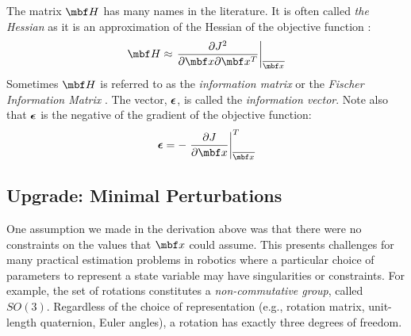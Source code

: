 \documentclass[11pt,a4,oneside]{article}
\begin{document}
The matrix $\mbf H$ has many names in the literature. It is often called {\em the Hessian} as it is an approximation of the Hessian of the objective function \citep{Triggs0000}:
\begin{equation}
  \mbf H \approx \left.\frac{\partial J^2}{\partial\mbf x \partial \mbf x^T}\right|_{\mbfbar x}
\end{equation}
 Sometimes $\mbf H$ is referred to as the {\em information matrix} or the {\em Fischer Information Matrix} \citep{Jauffret0700}. The vector, ${\boldsymbol{\epsilon}}$, is called the {\em information vector}. Note also that ${\boldsymbol{\epsilon}}$ is the negative of the gradient of the objective function:
\begin{equation}
  \mbs \epsilon = -\left.\pd{J}{\mbf x}\right|_{\mbfbar x}^T
\end{equation}

\subsection{Upgrade: Minimal Perturbations \label{ss:minimal-perturbations}}
One assumption we made in the derivation above was that there were no constraints on the values that $\mbf x$ could assume. 
 This presents challenges for many practical estimation problems in robotics where a particular choice of parameters to represent a state variable may have singularities or constraints. For example, 
 the set of rotations constitutes a {\em non-commutative group}, called $SO(3)$.  Regardless of the choice of representation (e.g., rotation matrix, unit-length quaternion, Euler angles), a rotation has exactly three degrees of freedom.  %
\end{document}

